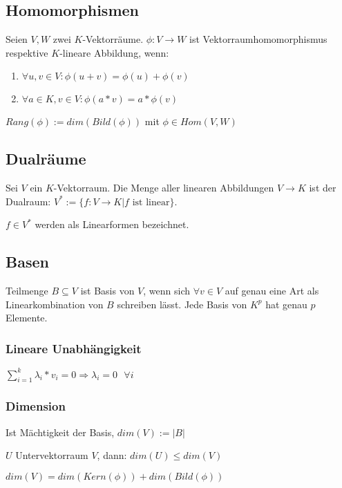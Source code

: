 \subsection*{Homomorphismen}

Seien $V, W$ zwei $K$-Vektorräume. $\phi : V \rightarrow W$ ist Vektorraumhomomorphismus respektive $K$-lineare Abbildung, wenn:

\begin{enumerate}[label=(\alph*)]
	\item $\forall u, v \in  V : \phi(u+v) = \phi(u)+\phi(v)$
	\item $\forall a \in K, v \in V : \phi(a*v) = a*\phi(v)$
\end{enumerate}

$Rang(\phi) := dim(Bild(\phi))$ mit $\phi \in Hom(V, W)$

\subsection*{Dualräume}

Sei $V$ ein $K$-Vektorraum. Die Menge aller linearen Abbildungen $V \rightarrow K$ ist der Dualraum: $V^* := \{f: V \rightarrow K | f \text{ ist linear}\}$.

$f \in V^*$ werden als Linearformen bezeichnet.

\subsection*{Basen}

Teilmenge $B \subseteq V$ ist Basis von $V$, wenn sich $\forall v \in V$ auf genau eine Art als Linearkombination von $B$ schreiben lässt. Jede Basis von $K^p$ hat genau $p$ Elemente.

\subsubsection*{Lineare Unabhängigkeit}

$\sum_{i=1}^{k} \lambda_i * v_i = 0 \Rightarrow \lambda_i = 0 \text{ } \forall i$

\subsubsection*{Dimension}

Ist Mächtigkeit der Basis, $dim(V) := |B|$

$U$ Untervektorraum $V$, dann: $dim(U) \leq dim(V)$

$dim(V) = dim(Kern(\phi)) + dim(Bild(\phi))$

